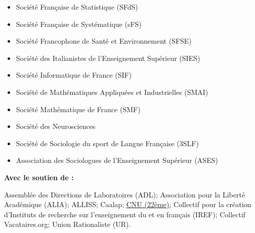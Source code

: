 \begin{itemize}
  \item Société Française de Statistique (SFdS)
  \item Société Française de Systématique (sFS)
  \item Société Francophone de Santé et Environnement (SFSE)
  \item Société des Italianistes de l'Enseignement Supérieur (SIES) 
  \item Société Informatique de France (SIF)
  \item Société de Mathématiques Appliquées et Industrielles (SMAI)
  \item Société Mathématique de France (SMF)
  \item Société des Neurosciences
  \item Société de Sociologie du sport de Langue Française (3SLF)
  \item Association des Sociologues de l’Enseignement Supérieur (ASES)
\end{itemize}

\vspace{3mm}

{\sffamily\bfseries\large Avec le soutien de :}

\vspace{1mm}

{\small\sffamily
Assemblée des Directions de Laboratoires (ADL);
Association pour la Liberté Académique (ALIA);
ALLISS;
Caalap;
\href{https://agorasur.fr/wp-content/uploads/2026/09/CNU_22.pdf}{CNU (22ème)};
Collectif pour la création d’Instituts de recherche sur l’enseignement du et en français (IREF);
Collectif Vacataires.org;
Union Rationaliste (UR).
}

\clearpage